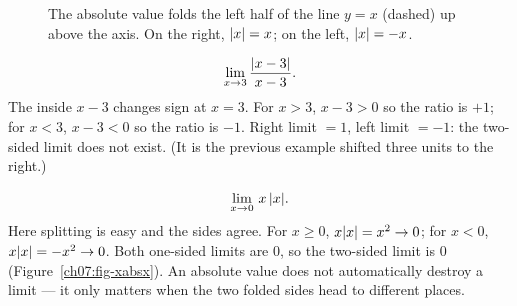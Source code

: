 \begin{figure}[htbp]
\centering
{}
\caption{The absolute value folds the left half of the line $y=x$ (dashed) up
above the axis. On the right, $\lvert x\rvert=x$; on the left, $\lvert x\rvert=-x$.}
\label{ch07:fig-fold}
\end{figure}

\begin{example}
\label{ch07:ex-abs-shift}
\[
  \lim_{x\to 3}\frac{\lvert x-3\rvert}{x-3}.
\]
The inside $x-3$ changes sign at $x=3$. For $x>3$, $x-3>0$ so the ratio is
$+1$; for $x<3$, $x-3<0$ so the ratio is $-1$. Right limit $=1$, left limit
$=-1$: the two-sided limit does not exist. (It is the previous example shifted
three units to the right.)
\end{example}

\begin{example}
\label{ch07:ex-abs-ok}
\[
  \lim_{x\to 0}\, x\,\lvert x\rvert.
\]
Here splitting is easy and the sides agree. For $x\ge 0$, $x\lvert x\rvert = x^2 \to 0$;
for $x<0$, $x\lvert x\rvert = -x^2 \to 0$. Both one-sided limits are $0$, so the
two-sided limit is $0$ (Figure~\ref{ch07:fig-xabsx}). An absolute value does not automatically destroy a
limit --- it only matters when the two folded sides head to different places.
\end{example}

